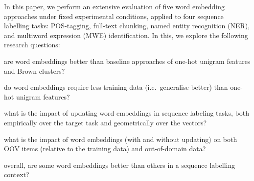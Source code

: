 In this paper, we perform an extensive evaluation of five word embedding
approaches under fixed experimental conditions, applied to four sequence
labelling tasks: POS-tagging, full-text chunking, named entity
recognition (NER), and multiword expression (MWE) identification. In
this, we explore the following research questions:
\begin{compactenum}[\bf RQ1:]
\item are word embeddings better than baseline approaches of one-hot
  unigram features and Brown clusters?
\item do word embeddings require less training data (i.e.\ generalise
  better) than one-hot unigram features?
\item what is the impact of updating word embeddings in sequence
  labeling tasks, both empirically over the target task and
  geometrically over the vectors?
\item what is the impact of word embeddings (with and without
  updating) on both OOV items (relative to the training data) and
  out-of-domain data?
\item overall, are some word embeddings better than others in a sequence
  labelling context?
\end{compactenum}


